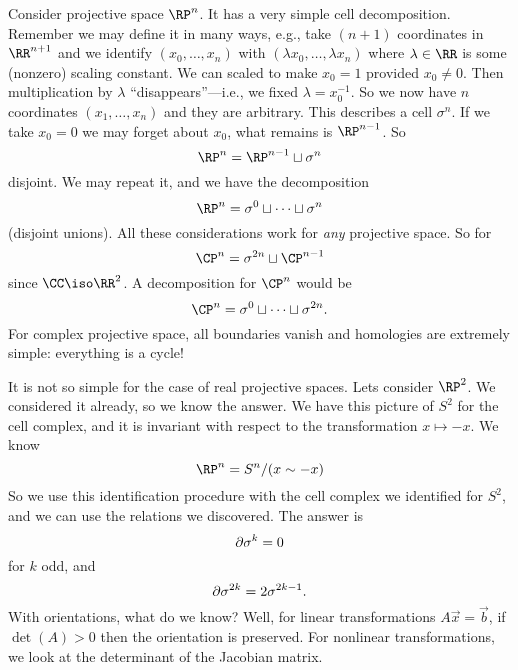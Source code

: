 \begin{ex}
Consider projective space $\RP^n$. It has a very simple cell
decomposition. Remember we may define it in many ways, e.g., take
$(n+1)$ coordinates in $\RR^{n+1}$ and we identify
$(x_0,\dots,x_n)$ with $(\lambda x_0,\dots,\lambda x_n)$ where
$\lambda\in\RR$ is some (nonzero) scaling constant. We can scaled
to make $x_0=1$ provided $x_0\not=0$. Then multiplication by
$\lambda$ ``disappears''---i.e., we fixed
$\lambda=x_{0}^{-1}$. So we now have $n$ coordinates
$(x_1,\dots,x_n)$ and they are arbitrary. This describes a cell
$\sigma^n$. If we take $x_0=0$ we may forget about $x_0$,
what remains is $\RP^{n-1}$. So
\begin{equation}
\RP^n=\RP^{n-1}\sqcup\sigma^{n}
\end{equation}
disjoint. We may repeat it, and we have the decomposition
\begin{equation}
\RP^n=\sigma^0\sqcup\dots\sqcup\sigma^n
\end{equation}
(disjoint unions). All these considerations work for \emph{any}
projective space. So for 
\begin{equation}
\CP^n=\sigma^{2n}\sqcup\CP^{n-1}
\end{equation}
since $\CC\iso\RR^2$. A decomposition for $\CP^n$ would be
\begin{equation}
\CP^n=\sigma^0\sqcup\dots\sqcup\sigma^{2n}.
\end{equation}
For complex projective space, all boundaries vanish and
homologies are extremely simple: everything is a cycle!

It is not so simple for the case of real projective spaces. Lets
consider $\RP^2$. We considered it already, so we know the
answer. We have this picture of $S^2$ for the cell complex, and
it is invariant with respect to the transformation
$x\mapsto-x$. We know
\begin{equation}
\RP^{n}=S^{n}/(x\sim-x)
\end{equation}
So we use this identification procedure with the cell complex we
identified for $S^2$, and we can use the relations we
discovered. The answer is 
\begin{equation}
\partial\sigma^k=0
\end{equation}
for $k$ odd, and
\begin{equation}
\partial\sigma^{2k}=2\sigma^{2k-1}.
\end{equation}
With orientations, what do we know? Well, for linear
transformations $A\vec{x}=\vec{b}$, if $\det(A)>0$ then the
orientation is preserved. For nonlinear transformations, we look
at the determinant of the Jacobian matrix.


\end{ex}
